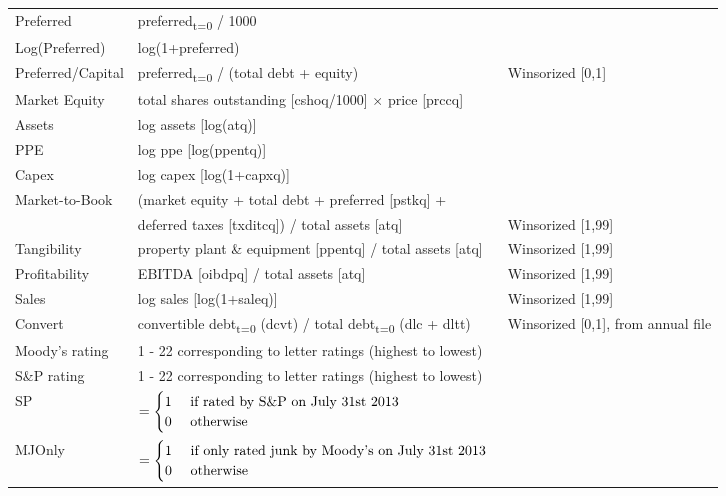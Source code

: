 \documentclass[a4paper, 12pt]{article}
\begin{document}
\begin{table}[htbp]
\begin{footnotesize}
\begin{tabular}{@{}lll@{}}
Preferred &   preferred\textsubscript{t=0} / 1000 & \\
Log(Preferred) &   log(1+preferred)  & \\
Preferred/Capital &   preferred\textsubscript{t=0} / (total debt + equity) & Winsorized [0,1]\\
Market Equity & total shares outstanding [cshoq/1000] $\times$  price [prccq] \\


Assets & log assets [log(atq)] &  \\
PPE & log ppe [log(ppentq)] & \\
Capex & log capex [log(1+capxq)]&  \\
Market-to-Book & (market equity + total debt + preferred [pstkq] + \\
& \quad deferred taxes [txditcq]) / total assets [atq] & Winsorized [1,99] \\
Tangibility & property plant \& equipment [ppentq] / total assets [atq]  & Winsorized [1,99] \\
Profitability & EBITDA [oibdpq] / total assets [atq]  & Winsorized [1,99] \\
Sales & log sales [log(1+saleq)]  & Winsorized [1,99] \\
Convert & convertible debt\textsubscript{t=0} (dcvt) / total debt\textsubscript{t=0} (dlc + dltt)  & Winsorized [0,1], from annual file \\
Moody's rating & 1 - 22 corresponding to letter ratings (highest to lowest)  &  \\
S\&P rating & 1 - 22 corresponding to letter ratings (highest to lowest)  &   \\


SP &  \begin{math}
=
\begin{cases}
 1  & \textnormal{ if rated by S\&P on July 31st 2013} \\
0 & \textnormal{ otherwise }
\end{cases}
\end{math}  \\
MJOnly &\begin{math}
=
\begin{cases}
 1  & \textnormal{ if only rated junk by Moody's on July 31st 2013 } \\
0 & \textnormal{ otherwise}


\end{cases}
\end{math}
\end{tabular}
\end{footnotesize}
\end{table}
\end{document}
